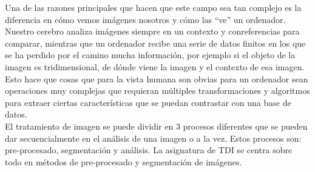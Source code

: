 \documentclass[a4paper,12pt]{report}
\begin{document}
Una de las razones principales que hacen que este campo sea tan complejo es la diferencia en cómo vemos imágenes nosotros y cómo las ``ve'' un ordenador. Nuestro cerebro analiza imágenes siempre en un contexto y conreferencias para comparar, mientras que un ordenador recibe una serie de datos finitos en los que se ha perdido por el camino mucha información, por ejemplo si el objeto de la imagen es tridimensional, de dónde viene la imagen y el contexto de esa imagen. Esto hace que cosas que para la vista humana son obvias para un ordenador sean operaciones muy complejas que requieran múltiples transformaciones y algoritmos para extraer ciertas características que se puedan contrastar con una base de datos.\\

El tratamiento de imagen se puede dividir en 3 procesos diferentes que se pueden dar secuencialmente en el análisis de una imagen o a la vez. Estos procesos son: pre-procesado, segmentación y análisis. La asignatura de TDI se centra sobre todo en métodos de pre-procesado y segmentación de imágenes.\\ 
\end{document}
